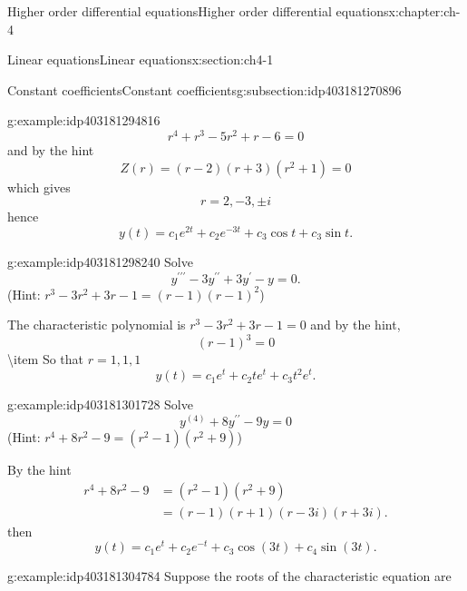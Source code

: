 \documentclass[oneside,10pt,]{book}
\numberwithin{equation}{section}
\numberwithin{equation}{section}
\newcommand{\amp}{&}
\begin{document}
\begin{chapterptx}{Higher order differential equations}{}{Higher order differential equations}{}{}{x:chapter:ch-4}
\begin{sectionptx}{Linear equations}{}{Linear equations}{}{}{x:section:ch4-1}
\begin{subsectionptx}{Constant coefficients}{}{Constant coefficients}{}{}{g:subsection:idp403181270896}
\begin{example}{}{g:example:idp403181294816}
\begin{equation*}
r^{4}+r^{3}-5r^{2}+r-6=0
\end{equation*}
and by the hint%
\begin{equation*}
Z(r)=\left(r-2\right)\left(r+3\right)\left(r^{2}+1\right)=0
\end{equation*}
which gives%
\begin{equation*}
r=2,-3,\pm i
\end{equation*}
hence%
\begin{equation*}
y(t)=c_{1}e^{2t}+c_{2}e^{-3t}+c_{3}\cos t+c_{3}\sin t.
\end{equation*}
%
\end{example}
\begin{example}{}{g:example:idp403181298240}%
Solve%
\begin{equation*}
y^{\prime\prime\prime}-3y^{\prime\prime}+3y^{\prime}-y=0.
\end{equation*}
(Hint: \(r^{3}-3r^{2}+3r-1=\left(r-1\right)\left(r-1\right)^{2}\))%
\par
The characteristic polynomial is \(r^{3}-3r^{2}+3r-1=0\) and by the hint,%
\begin{equation*}
\left(r-1\right)^{3}=0
\end{equation*}
\textbackslash{}item So that \(r=1,1,1\)%
\begin{equation*}
y(t)=c_{1}e^{t}+c_{2}te^{t}+c_{3}t^{2}e^{t}.
\end{equation*}
%
\end{example}
\begin{example}{}{g:example:idp403181301728}%
Solve%
\begin{equation*}
y^{(4)}+8y^{\prime\prime}-9y=0
\end{equation*}
(Hint: \(r^{4}+8r^{2}-9=\left(r^{2}-1\right)\left(r^{2}+9\right)\))%
\par
By the hint%
\begin{align*}
r^{4}+8r^{2}-9 \amp =\left(r^{2}-1\right)\left(r^{2}+9\right)\\
\amp =\left(r-1\right)\left(r+1\right)\left(r-3i\right)\left(r+3i\right).
\end{align*}
then%
\begin{equation*}
y(t)=c_{1}e^{t}+c_{2}e^{-t}+c_{3}\cos(3t)+c_{4}\sin(3t).
\end{equation*}
%
\end{example}
\begin{example}{}{g:example:idp403181304784}%
Suppose the roots of the characteristic equation are%
\begin{equation*}

\end{equation*}
\end{example}
\end{subsectionptx}
\end{sectionptx}
\end{chapterptx}
\end{document}
